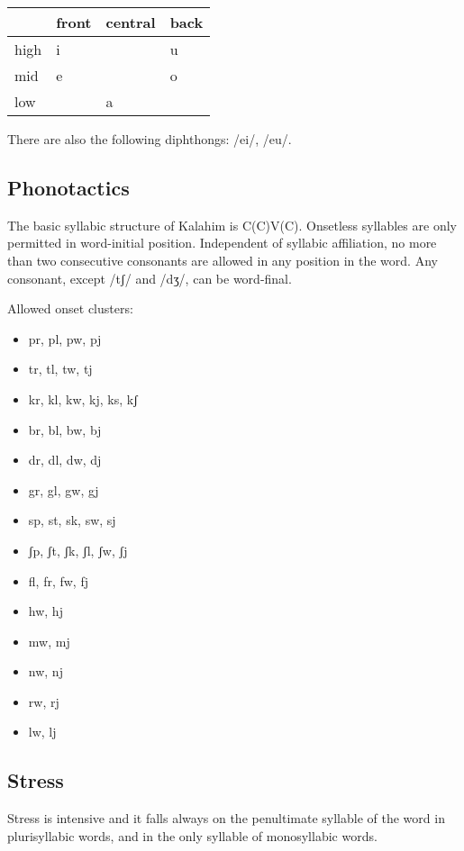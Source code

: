 \documentclass[
  a4paper,
]{article}
\providecommand{\tightlist}{%
  \setlength{\itemsep}{0pt}\setlength{\parskip}{0pt}}
\begin{document}
\begin{longtable}[]{@{}llll@{}}
\toprule
& front & central & back \\
\midrule
\endhead
high & i & & u \\
mid & e & & o \\
low & & a & \\
\bottomrule
\end{longtable}

There are also the following diphthongs: /ei/, /eu/.

\hypertarget{phonotactics}{%
\subsection{Phonotactics}\label{phonotactics}}

The basic syllabic structure of Kalahim is C(C)V(C). Onsetless syllables
are only permitted in word-initial position. Independent of syllabic
affiliation, no more than two consecutive consonants are allowed in any
position in the word. Any consonant, except /tʃ/ and /dʒ/, can be
word-final.

Allowed onset clusters:

\begin{itemize}
\tightlist
\item
  pr, pl, pw, pj
\item
  tr, tl, tw, tj
\item
  kr, kl, kw, kj, ks, kʃ
\item
  br, bl, bw, bj
\item
  dr, dl, dw, dj
\item
  gr, gl, gw, gj
\item
  sp, st, sk, sw, sj
\item
  ʃp, ʃt, ʃk, ʃl, ʃw, ʃj
\item
  fl, fr, fw, fj
\item
  hw, hj
\item
  mw, mj
\item
  nw, nj
\item
  rw, rj
\item
  lw, lj
\end{itemize}

\hypertarget{stress}{%
\subsection{Stress}\label{stress}}

Stress is intensive and it falls always on the penultimate syllable of
the word in plurisyllabic words, and in the only syllable of
monosyllabic words.
\end{document}
